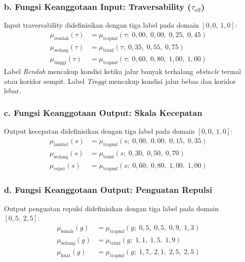 \subsubsection*{b. Fungsi Keanggotaan Input: Traversability ($\tau_\text{eff}$)}

Input traversability didefinisikan dengan tiga label pada domain $[0{,}0,\ 1{,}0]$:
\begin{align}
    \mu_\text{rendah}(\tau) &= \mu_\text{trapmf}(\tau;\;0{,}00,\;0{,}00,\;0{,}25,\;0{,}45) \label{eq:mf_rendah} \\
    \mu_\text{sedang}(\tau) &= \mu_\text{trimf}(\tau;\;0{,}35,\;0{,}55,\;0{,}75)           \label{eq:mf_sedang_t} \\
    \mu_\text{tinggi}(\tau) &= \mu_\text{trapmf}(\tau;\;0{,}60,\;0{,}80,\;1{,}00,\;1{,}00) \label{eq:mf_tinggi}
\end{align}
Label \textit{Rendah} mencakup kondisi ketika jalur banyak terhalang \textit{obstacle} termal atau koridor sempit. Label \textit{Tinggi} mencakup kondisi jalur bebas dan koridor lebar.

\subsubsection*{c. Fungsi Keanggotaan Output: Skala Kecepatan}

Output kecepatan didefinisikan dengan tiga label pada domain $[0{,}0,\ 1{,}0]$:
\begin{align}
    \mu_\text{lambat}(s) &= \mu_\text{trapmf}(s;\;0{,}00,\;0{,}00,\;0{,}15,\;0{,}35) \label{eq:mf_lambat} \\
    \mu_\text{sedang}(s) &= \mu_\text{trimf}(s;\;0{,}30,\;0{,}50,\;0{,}70)           \label{eq:mf_sedang_s} \\
    \mu_\text{cepat}(s)  &= \mu_\text{trapmf}(s;\;0{,}60,\;0{,}80,\;1{,}00,\;1{,}00) \label{eq:mf_cepat}
\end{align}

\subsubsection*{d. Fungsi Keanggotaan Output: Penguatan Repulsi}

Output penguatan repulsi didefinisikan dengan tiga label pada domain $[0{,}5,\ 2{,}5]$:
\begin{align}
    \mu_\text{lemah}(g)  &= \mu_\text{trapmf}(g;\;0{,}5,\;0{,}5,\;0{,}9,\;1{,}3) \label{eq:mf_lemah} \\
    \mu_\text{sedang}(g) &= \mu_\text{trimf}(g;\;1{,}1,\;1{,}5,\;1{,}9)           \label{eq:mf_sedang_g} \\
    \mu_\text{kuat}(g)   &= \mu_\text{trapmf}(g;\;1{,}7,\;2{,}1,\;2{,}5,\;2{,}5) \label{eq:mf_kuat}
\end{align}

